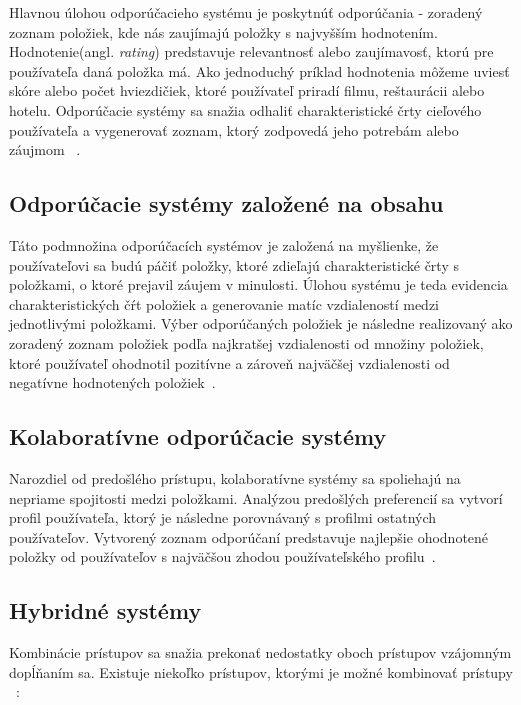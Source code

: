 Hlavnou úlohou odporúčacieho systému je poskytnúť odporúčania - zoradený zoznam položiek, kde nás zaujímajú položky s najvyšším hodnotením. Hodnotenie(angl. \textit{rating}) predstavuje relevantnosť alebo zaujímavosť, ktorú pre používateľa daná položka má. Ako jednoduchý príklad hodnotenia môžeme uviesť skóre alebo počet hviezdičiek, ktoré používateľ priradí filmu, reštaurácii alebo hotelu. Odporúčacie systémy sa snažia odhaliť charakteristické črty cieľového používateľa a vygenerovať zoznam, ktorý zodpovedá jeho potrebám alebo záujmom ~\cite{adomavicius2005toward}.

\subsection{Odporúčacie systémy založené na obsahu}
\label{content_based_recommenders}

Táto podmnožina odporúčacích systémov je založená na myšlienke, že používateľovi sa budú páčiť položky, ktoré zdieľajú charakteristické črty s položkami, o ktoré prejavil záujem v minulosti. Úlohou systému je teda evidencia charakteristických čŕt položiek a generovanie matíc vzdialeností medzi jednotlivými položkami. Výber odporúčaných položiek je následne realizovaný ako zoradený zoznam položiek podľa najkratšej vzdialenosti od množiny položiek, ktoré používateľ ohodnotil pozitívne a zároveň najväčšej vzdialenosti od negatívne hodnotených položiek~\cite{adomavicius2005toward}.


\subsection{Kolaboratívne odporúčacie systémy}
\label{collaboration_based_recommenders}

Narozdiel od predošlého prístupu, kolaboratívne systémy sa spoliehajú na nepriame spojitosti medzi položkami. Analýzou predošlých preferencií sa vytvorí profil používateľa, ktorý je následne porovnávaný s profilmi ostatných používateľov. Vytvorený zoznam odporúčaní predstavuje najlepšie ohodnotené položky od používateľov s najväčšou zhodou používateľského profilu~\cite{adomavicius2005toward}.

\subsection{Hybridné systémy}
\label{hybrid_recommenders}

Kombinácie prístupov sa snažia prekonať nedostatky oboch prístupov vzájomným dopĺňaním sa. Existuje niekoľko prístupov, ktorými je možné kombinovať prístupy ~\cite{burke2002hybrid}:

